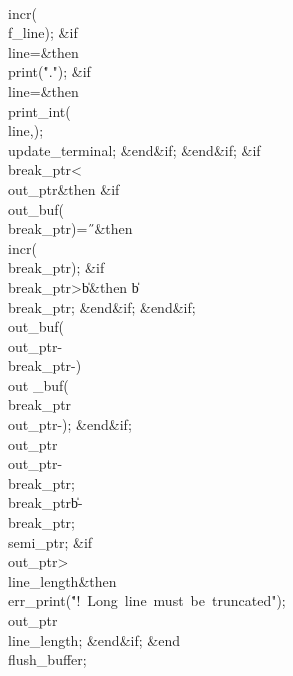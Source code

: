 \\{incr}\?\1(\?\\{f\_line}\?\2)\?;\6
\&{if}\1\1\8\\{line}\?\?=\2\8\&{then}\6
\\{print}\?\1(\?\.{"."}\?\2)\?;\6
\&{if}\1\1\8\\{line}\?\?=\2\8\&{then}\6
\\{print\_int}\?\1(\?\\{line}\?,\?\2)\?;\5
\\{update\_terminal};\2\6
\&{end}\8\2\&{if}\1;\2\6
\&{end}\8\2\&{if}\1;\6
\&{if}\1\1\8\\{break\_ptr}\?<\?\\{out\_ptr}\2\8\&{then}\6
\&{if}\1\1\8\\{out\_buf}\?\1(\?\\{break\_ptr}\?\2)=\?\H{\ }\2\8\&{then}\6
\\{incr}\?\1(\?\\{break\_ptr}\?\2)\?;\6
\&{if}\1\1\8\\{break\_ptr}\?>\?\|b\2\8\&{then}\6
\|b\?\K\?\\{break\_ptr};\2\6
\&{end}\8\2\&{if}\1;\2\6
\&{end}\8\2\&{if}\1;\6
\\{out\_buf}\?\1(\?\to\?\\{out\_ptr}\?-\?\\{break\_ptr}\?-\?\2)\K\?\\{out%
\_buf}\?\1(\?\\{break\_ptr}\?\to\?\\{out\_ptr}\?-\?\2)\?;\2\6
\&{end}\8\2\&{if}\1;\6
\\{out\_ptr}\?\K\?\\{out\_ptr}\?-\?\\{break\_ptr};\5
\\{break\_ptr}\?\K\?\|b\?-\?\\{break\_ptr};\5
\\{semi\_ptr}\?\K{};\6
\&{if}\1\1\8\\{out\_ptr}\?>\?\\{line\_length}\2\8\&{then}\6
\\{err\_print}\?\1(\?\.{"!\ Long\ line\ must\ be\ truncated"}\?\2)\?;\6
\\{out\_ptr}\?\K\?\\{line\_length};\2\6
\&{end}\8\2\&{if}\1;\2\6
\&{end}\8\\{flush\_buffer};\par
\fi


